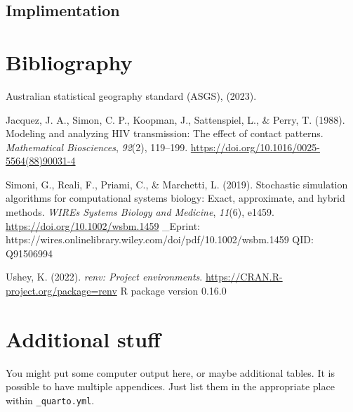 \documentclass[
  letterpaper,
  DIV=11,
  numbers=noendperiod]{scrreprt}
\newlength{\cslhangindent}
\newlength{\cslentryspacingunit} %
\newenvironment{CSLReferences}[2] %
 {%
  \setlength{\parindent}{0pt}
  \ifodd #1
  \let\oldpar\par
  \def\par{\hangindent=\cslhangindent\oldpar}
  \fi
  \setlength{\parskip}{#2\cslentryspacingunit}
 }%
 {}
\begin{document}
\hypertarget{implimentation}{%
\section{Implimentation}\label{implimentation}}


\hypertarget{bibliography}{%
\chapter*{Bibliography}\label{bibliography}}


\hypertarget{refs}{}
\begin{CSLReferences}{1}{0}
\leavevmode{}%
Australian statistical geography standard (ASGS), (2023).

\leavevmode{}%
Jacquez, J. A., Simon, C. P., Koopman, J., Sattenspiel, L., \& Perry, T.
(1988). Modeling and analyzing HIV transmission: The effect of contact
patterns. \emph{Mathematical Biosciences}, \emph{92}(2), 119--199.
\url{https://doi.org/10.1016/0025-5564(88)90031-4}

\leavevmode{}%
Simoni, G., Reali, F., Priami, C., \& Marchetti, L. (2019). Stochastic
simulation algorithms for computational systems biology: Exact,
approximate, and hybrid methods. \emph{WIREs Systems Biology and
Medicine}, \emph{11}(6), e1459. \url{https://doi.org/10.1002/wsbm.1459}
{\_}Eprint:
https://wires.onlinelibrary.wiley.com/doi/pdf/10.1002/wsbm.1459 QID:
Q91506994

\leavevmode{}%
Ushey, K. (2022). \emph{{renv}: Project environments}.
\url{https://CRAN.R-project.org/package=renv} R package version 0.16.0

\end{CSLReferences}

\cleardoublepage
{}
{}
\appendix

\hypertarget{additional-stuff}{%
\chapter{Additional stuff}\label{additional-stuff}}

You might put some computer output here, or maybe additional tables. It
is possible to have multiple appendices. Just list them in the
appropriate place within \texttt{\_quarto.yml}.
\end{document}
